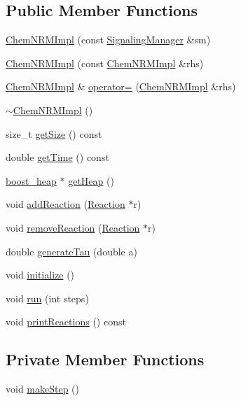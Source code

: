 \subsection*{Public Member Functions}
\begin{DoxyCompactItemize}
\item 
\hyperlink{classChemNRMImpl_ad55314d35825dc79f7b4b491ec9ef500}{Chem\-N\-R\-M\-Impl} (const \hyperlink{classSignalingManager}{Signaling\-Manager} \&sm)
\item 
\hyperlink{classChemNRMImpl_a56b198a7965bb226c87579bdab243f80}{Chem\-N\-R\-M\-Impl} (const \hyperlink{classChemNRMImpl}{Chem\-N\-R\-M\-Impl} \&rhs)
\item 
\hyperlink{classChemNRMImpl}{Chem\-N\-R\-M\-Impl} \& \hyperlink{classChemNRMImpl_a3cbb442f4d322a02fa84e16fa23b8ea7}{operator=} (\hyperlink{classChemNRMImpl}{Chem\-N\-R\-M\-Impl} \&rhs)
\item 
\hyperlink{classChemNRMImpl_aca8d50551cdb52e67f1707df35a60c46}{$\sim$\-Chem\-N\-R\-M\-Impl} ()
\item 
size\-\_\-t \hyperlink{classChemNRMImpl_ac48e214385413158609cf016caaaac6b}{get\-Size} () const 
\item 
double \hyperlink{classChemNRMImpl_a94194658c0574c4a8673683305db5eea}{get\-Time} () const 
\item 
\hyperlink{ChemNRMImpl_8h_a57f859851909ca786c37681af9b01d45}{boost\-\_\-heap} $\ast$ \hyperlink{classChemNRMImpl_a1b20f4b9807c0b01f36f9222628c3267}{get\-Heap} ()
\item 
void \hyperlink{classChemNRMImpl_a706960c4cf9dc25084606be64739bbd0}{add\-Reaction} (\hyperlink{classReaction}{Reaction} $\ast$r)
\item 
void \hyperlink{classChemNRMImpl_a8313f88ef5e51fc9ae830a5a20f23691}{remove\-Reaction} (\hyperlink{classReaction}{Reaction} $\ast$r)
\item 
double \hyperlink{classChemNRMImpl_a89100a7f4c925ba44fa07e198cac0b4f}{generate\-Tau} (double a)
\item 
void \hyperlink{classChemNRMImpl_afadda6d4f7fbb164c4ea487034930f47}{initialize} ()
\item 
void \hyperlink{classChemNRMImpl_a9ac6c3c854c0a27c04d89be3d3927c09}{run} (int steps)
\item 
void \hyperlink{classChemNRMImpl_aa0b3b3dad40946f941959f5fdc9ef625}{print\-Reactions} () const 
\end{DoxyCompactItemize}
\subsection*{Private Member Functions}
\begin{DoxyCompactItemize}
\item 
void \hyperlink{classChemNRMImpl_ab3153d6fbcbb3273530c0a011910f31b}{make\-Step} ()
\end{DoxyCompactItemize}
